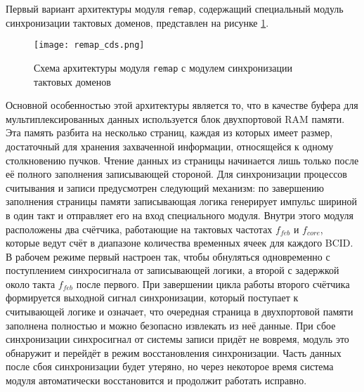 Первый вариант архитектуры модуля \texttt{remap}, содержащий специальный модуль синхронизации тактовых доменов, представлен на рисунке \ref{fig:remap_cds}.\par
\begin{figure}[ht]
    \centering
    \texttt{[image: remap\_cds.png]}
    \caption{Схема архитектуры модуля \texttt{remap} с модулем синхронизации тактовых доменов}
    \label{fig:remap_cds}
\end{figure}\par
Основной особенностью этой архитектуры является то, что в качестве буфера для мультиплексированных данных используется блок двухпортовой RAM памяти. Эта память разбита на несколько страниц, каждая из которых имеет размер, достаточный для хранения захваченной информации, относящейся к одному столкновению пучков. Чтение данных из страницы начинается лишь только после её полного заполнения записывающей стороной. Для синхронизации процессов считывания и записи предусмотрен следующий механизм: по завершению заполнения страницы памяти записывающая логика генерирует импульс шириной в один такт и отправляет его на вход специального модуля. Внутри этого модуля расположены два счётчика, работающие на тактовых частотах $f_{feb}$ и $f_{core}$, которые ведут счёт в диапазоне количества временных ячеек для каждого BCID. В рабочем режиме первый настроен так, чтобы обнуляться одновременно с поступлением синхросигнала от записывающей логики, а второй с задержкой около такта $f_{feb}$ после первого. При завершении цикла работы второго счётчика формируется выходной сигнал синхронизации, который поступает к считывающей логике и означает, что очередная страница в двухпортовой памяти заполнена полностью и можно безопасно извлекать из неё данные. При сбое синхронизации синхросигнал от системы записи придёт не вовремя, модуль это обнаружит и перейдёт в режим восстановления синхронизации. Часть данных после сбоя синхронизации будет утеряно, но через некоторое время система модуля автоматически восстановится и продолжит работать исправно.\par
